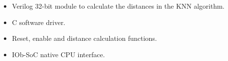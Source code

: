 \begin{itemize}
\item Verilog 32-bit module to calculate the distances in the KNN algorithm.
\item C software driver.
\item Reset, enable and distance calculation functions.
\item IOb-SoC native CPU interface.
\end{itemize}
